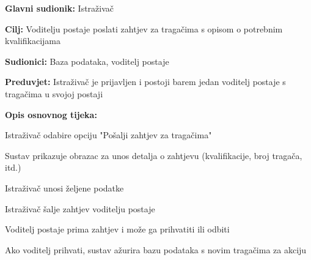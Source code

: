 					\noindent {}
					\begin{packed_item}
						
						\item \textbf{Glavni sudionik: }Istraživač
						\item  \textbf{Cilj:} Voditelju postaje poslati zahtjev za tragačima s opisom o potrebnim kvalifikacijama
						\item  \textbf{Sudionici:} Baza podataka, voditelj postaje
						\item  \textbf{Preduvjet:} Istraživač je prijavljen i postoji barem jedan voditelj postaje s tragačima u svojoj postaji 
						\item  \textbf{Opis osnovnog tijeka:}
						
						\item[] \begin{packed_enum}
							
							\item Istraživač odabire opciju "Pošalji zahtjev za tragačima" 
							\item Sustav prikazuje obrazac za unos detalja o zahtjevu (kvalifikacije, broj tragača, itd.) 
							\item Istraživač unosi željene podatke 
							\item Istraživač šalje zahtjev voditelju postaje 
							\item Voditelj postaje prima zahtjev i može ga prihvatiti ili odbiti 
							\item Ako voditelj prihvati, sustav ažurira bazu podataka s novim tragačima za akciju 
						\end{packed_enum}
					\end{packed_item}
					
